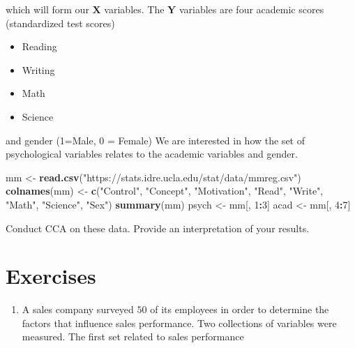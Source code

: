 \documentclass[
]{book}
\newenvironment{Shaded}{\begin{snugshade}}{\end{snugshade}}
\newcommand{\DecValTok}[1]{\textcolor[rgb]{0.00,0.00,0.81}{#1}}
\newcommand{\FunctionTok}[1]{\textcolor[rgb]{0.13,0.29,0.53}{\textbf{#1}}}
\newcommand{\NormalTok}[1]{#1}
\newcommand{\OtherTok}[1]{\textcolor[rgb]{0.56,0.35,0.01}{#1}}
\newcommand{\SpecialCharTok}[1]{\textcolor[rgb]{0.81,0.36,0.00}{\textbf{#1}}}
\newcommand{\StringTok}[1]{\textcolor[rgb]{0.31,0.60,0.02}{#1}}
\providecommand{\tightlist}{%
  \setlength{\itemsep}{0pt}\setlength{\parskip}{0pt}}
\theoremstyle{definition}
\theoremstyle{definition}
\theoremstyle{definition}
\theoremstyle{definition}
\theoremstyle{remark}
\begin{document}
which will form our \(\mathbf X\) variables. The \(\mathbf Y\) variables are four academic scores (standardized test scores)

\begin{itemize}
\tightlist
\item
  Reading
\item
  Writing
\item
  Math
\item
  Science
\end{itemize}

and gender (1=Male, 0 = Female) We are interested in how the set of psychological variables relates to the academic variables and gender.

\begin{Shaded}
\begin{Highlighting}[]
\NormalTok{mm }\OtherTok{\textless{}{-}} \FunctionTok{read.csv}\NormalTok{(}\StringTok{"https://stats.idre.ucla.edu/stat/data/mmreg.csv"}\NormalTok{)}
\FunctionTok{colnames}\NormalTok{(mm) }\OtherTok{\textless{}{-}} \FunctionTok{c}\NormalTok{(}\StringTok{"Control"}\NormalTok{, }\StringTok{"Concept"}\NormalTok{, }\StringTok{"Motivation"}\NormalTok{,}
                  \StringTok{"Read"}\NormalTok{, }\StringTok{"Write"}\NormalTok{, }\StringTok{"Math"}\NormalTok{,}
    \StringTok{"Science"}\NormalTok{, }\StringTok{"Sex"}\NormalTok{)}
\FunctionTok{summary}\NormalTok{(mm)}
\NormalTok{psych }\OtherTok{\textless{}{-}}\NormalTok{ mm[, }\DecValTok{1}\SpecialCharTok{:}\DecValTok{3}\NormalTok{]}
\NormalTok{acad }\OtherTok{\textless{}{-}}\NormalTok{ mm[, }\DecValTok{4}\SpecialCharTok{:}\DecValTok{7}\NormalTok{]}
\end{Highlighting}
\end{Shaded}

Conduct CCA on these data. Provide an interpretation of your results.

\hypertarget{exercises-2}{%
\section{Exercises}\label{exercises-2}}

\begin{enumerate}
\def\labelenumi{\arabic{enumi}.}
\tightlist
\item
  A sales company surveyed \(50\) of its employees in order to determine the factors that influence sales performance. Two collections of variables were measured. The first set related to sales performance
\end{enumerate}
\end{document}
